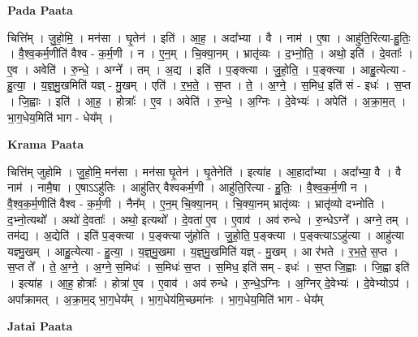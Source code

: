 \documentclass[17pt]{extarticle}
\begin{document}
\textbf{Pada Paata} \newline

चित्ति᳚म् । जु॒हो॒मि॒ । मन॑सा । घृ॒तेन॑ । इति॑ । आ॒ह॒ । अदा᳚भ्या । वै । नाम॑ । ए॒षा । आहु॑ति॒रित्या-हु॒तिः॒ । वै॒श्व॒कर्म॒णीति॑ वैश्व - क॒र्म॒णी । न । ए॒न॒म् । चि॒क्या॒नम् । भ्रातृ॑व्यः । द॒भ्नो॒ति॒ । अथो॒ इति॑ । दे॒वताः᳚ । ए॒व । अवेति॑ । रु॒न्धे॒ । अग्ने᳚ । तम् । अ॒द्य । इति॑ । प॒ङ्क्त्या । जु॒हो॒ति॒ । प॒ङ्क्त्या । आहु॒त्येत्या - हु॒त्या॒ । य॒ज्ञ्॒मु॒खमिति॑ यज्ञ् - मु॒खम् । एति॑ । र॒भ॒ते॒ । स॒प्त । ते॒ । अ॒ग्ने॒ । स॒मिध॒ इति॑ सं - इधः॑ । स॒प्त । जि॒ह्वाः । इति॑ । आ॒ह॒ । होत्राः᳚ । ए॒व । अवेति॑ । रु॒न्धे॒ । अ॒ग्निः । दे॒वेभ्यः॑ । अपेति॑ । अ॒क्रा॒म॒त् । भा॒ग॒धेय॒मिति॑ भाग - धेय᳚म् ।  \newline


\textbf{Krama Paata} \newline

चित्ति॑म् जुहोमि । जु॒हो॒मि॒ मन॑सा । मन॑सा घृ॒तेन॑ । घृ॒तेनेति॑ । इत्या॑ह । आ॒हादा᳚भ्या । अदा᳚भ्या॒ वै । वै नाम॑ । नामै॒षा । ए॒षाऽऽहु॑तिः । आहु॑तिर् वैश्वकर्म॒णी । आहु॑ति॒रित्या - हु॒तिः॒ । वै॒श्व॒क॒र्म॒णी न । वै॒श्व॒क॒र्म॒णीति॑ वैश्व - क॒र्म॒णी । नैन᳚म् । ए॒न॒म् चि॒क्या॒नम् । चि॒क्या॒नम् भ्रातृ॑व्यः । भ्रातृ॑व्यो दभ्नोति । द॒भ्नो॒त्यथो᳚ । अथो॑ दे॒वताः᳚ । अथो॒ इत्यथो᳚ । दे॒वता॑ ए॒व । ए॒वाव॑ । अव॑ रुन्धे । रु॒न्धेऽग्ने᳚ । अग्ने॒ तम् । तम॑द्य । अ॒द्येति॑ । इति॑ प॒ङ्क्त्या । प॒ङ्क्त्या जु॑होति । जु॒हो॒ति॒ प॒ङ्क्त्या । प॒ङ्क्त्याऽऽहु॑त्या । आहु॑त्या यज्ञ्मु॒खम् । आहु॒त्येत्या - हु॒त्या॒ । य॒ज्ञ्॒मु॒खमा । य॒ज्ञ्॒मु॒खमिति॑ यज्ञ् - मु॒खम् । आ र॑भते । र॒भ॒ते॒ स॒प्त । स॒प्त ते᳚ । ते॒ अ॒ग्ने॒ । अ॒ग्ने॒ स॒मिधः॑ । स॒मिधः॑ स॒प्त । स॒मिध॒ इति॑ सम् - इधः॑ । स॒प्त जि॒ह्वाः । जि॒ह्वा इति॑ । इत्या॑ह । आ॒ह॒ होत्राः᳚ । होत्रा॑ ए॒व । ए॒वाव॑ । अव॑ रुन्धे । रु॒न्धे॒ऽग्निः । अ॒ग्निर् दे॒वेभ्यः॑ । दे॒वेभ्योऽप॑ । अपा᳚क्रामत् । अ॒क्रा॒म॒द् भा॒ग॒धेय᳚म् । भा॒ग॒धेय॑मि॒च्छमा॑नः । भा॒ग॒धेय॒मिति॑ भाग - धेय᳚म् \newline

\textbf{Jatai Paata} \newline
\end{document}

